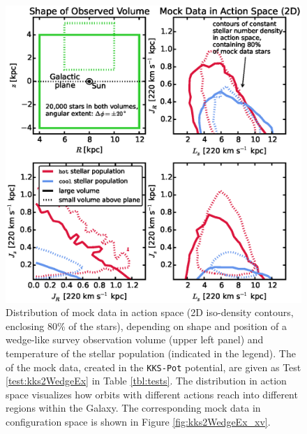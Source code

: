 
\begin{figure}[!htbp]
\centering
\includegraphics[width=\columnwidth]{figs/kks2WedgeEx_mockdata_actions.eps}
\caption{Distribution of mock data in action space (2D iso-density contours, enclosing 80\% of the stars), depending on shape and position of a wedge-like survey observation volume (upper left panel) and temperature of the stellar population (indicated in the legend). The \pmodel{} of the mock data, created in the \texttt{KKS-Pot} potential, are given as Test \ref{test:kks2WedgeEx} in Table \ref{tbl:tests}. The distribution in action space visualizes how orbits with different actions reach into different regions within the Galaxy. The corresponding mock data in configuration space is shown in Figure \ref{fig:kks2WedgeEx_xv}.} 
\label{fig:kks2WedgeEx_actions}
\end{figure}

